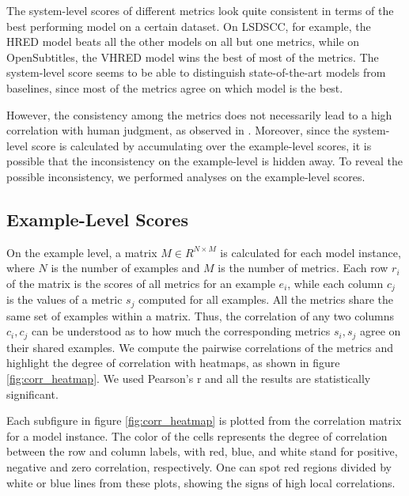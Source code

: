 \documentclass[runningheads]{llncs}
\begin{document}
    The system-level scores of different metrics look quite consistent in terms of the best performing model on a certain dataset. On LSDSCC, for example, the HRED model beats all the other models on all but one metrics, while on OpenSubtitles, the VHRED model wins the best of most of the metrics. The system-level score seems to be able to distinguish state-of-the-art models from baselines, since most of the metrics agree on which model is the best.

    However, the consistency among the metrics does not necessarily lead to a high correlation with human judgment, as observed in \cite{HowNot}. Moreover, since the system-level score is calculated by accumulating over the example-level scores, it is possible that the inconsistency on the example-level is hidden away. To reveal the possible inconsistency, we performed analyses on the example-level scores.

    \subsection{Example-Level Scores}
    On the example level, a matrix $M \in R^{N \times M}$ is calculated for each model instance, where $N$ is the number of examples and $M$ is the number of metrics. Each row $r_i$ of the matrix is the scores of all metrics for an example $e_i$, while each column $c_j$ is the values of a metric $s_j$ computed for all examples. All the metrics share the same set of examples within a matrix. Thus, the correlation of any two columns $c_i, c_j$ can be understood as to how much the corresponding metrics $s_i, s_j$ agree on their shared examples. We compute the pairwise correlations of the metrics and highlight the degree of correlation with heatmaps, as shown in figure \ref{fig:corr_heatmap}. We used Pearson's r and all the results are statistically significant.

    

    Each subfigure in figure \ref{fig:corr_heatmap} is plotted from the correlation matrix for a model instance. The color of the cells represents the degree of correlation between the row and column labels, with red, blue, and white stand for positive, negative and zero correlation, respectively. One can spot red regions divided by white or blue lines from these plots, showing the signs of high local correlations.
\end{document}
